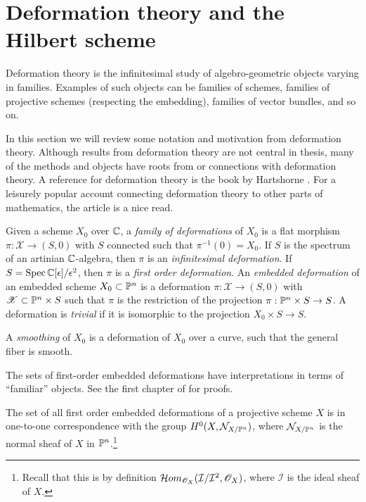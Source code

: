 

\section{Deformation theory and the Hilbert scheme}

Deformation theory is the infinitesimal study of algebro-geometric objects varying in families. Examples of such objects can be families of schemes, families of projective schemes (respecting the embedding), families of vector bundles, and so on.

In this section we will review some notation and motivation from deformation theory. Although results from deformation theory are not central in thesis, many of the methods and objects have roots from or connections with deformation theory. A reference for deformation theory is the book by Hartshorne \cite{hartshorne_deformations}. For a leisurely popular account connecting deformation theory to other parts of mathematics, the article \cite{mazur_deformations} is a nice read.

\begin{definition}
Given a scheme $X_0$ over $\C$, a \emph{family of deformations} of $X_0$ is a flat morphism $\pi:\mathscr X \to (S,0)$ with $S$ connected such that $\pi^{-1}(0)=X_0$. If $S$ is the spectrum of an artinian $\C$-algebra, then $\pi$ is an \emph{infinitesimal deformation}. If $S=\Spec \C[\epsilon]/\epsilon^2$, then  $\pi$ is a \emph{first order deformation}. An \emph{embedded deformation} of an embedded scheme $X_0 \subset \P^n$ is a deformation $\pi:\mathscr X \to (S,0)$ with $\mathscr X \subset \P^n \times S$ such that $\pi$ is the restriction of the projection $\pi:\P^n \times S \to S$. A deformation is \emph{trivial} if it is isomorphic to the projection $X_0 \times S \to S$.  

A \emph{smoothing} of $X_0$ is a deformation of $X_0$ over a curve, such that the general fiber is smooth.
\end{definition}

The sets of first-order embedded deformations have interpretations in terms of ``familiar'' objects. See the first chapter of \cite{hartshorne_deformations} for proofs.

\begin{proposition}
The set of all first order embedded deformations of a projective scheme $X$ is in one-to-one correspondence with the group $H^0(X,\mathcal N_{X/\P^n})$, where $\mathcal N_{X/\P^n}$ is the normal sheaf of $X$ in $\P^n$.\footnote{Recall that this is by definition $\mathcal Hom_{\OO_X}(\mathcal I/\mathcal I^2, \OO_X)$, where $\mathcal I$ is the ideal sheaf of $X$.}
\end{proposition}

